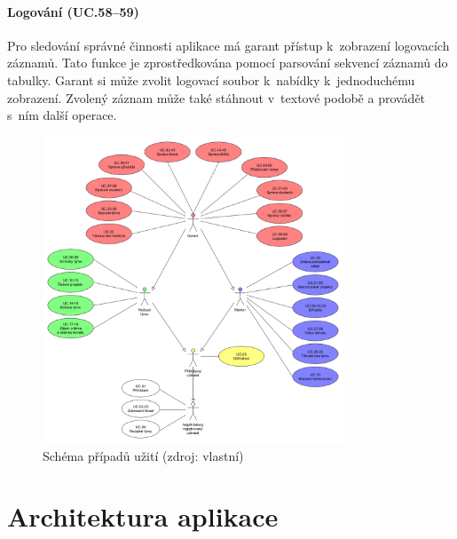 \documentclass[czech,BP]{thesiskiv}
\begin{document}
			\subsubsection{Logování (UC.58--59)}
			\par Pro sledování správné činnosti aplikace má garant přístup k~zobrazení logovacích záznamů. Tato funkce je zprostředkována pomocí parsování sekvencí záznamů do tabulky. Garant si může zvolit logovací soubor k~nabídky k~jednoduchému zobrazení. Zvolený záznam může také stáhnout v~textové podobě a provádět s~ním další operace.
		\begin{figure}[h]
			\centering
			\includegraphics[width=0.8\textwidth]{img/use_case/use_case_diagram}
			\caption{Schéma případů užití (zdroj: vlastní)}
			\label{fig:use-case}
		\end{figure}
	\chapter{Architektura aplikace}
\end{document}
